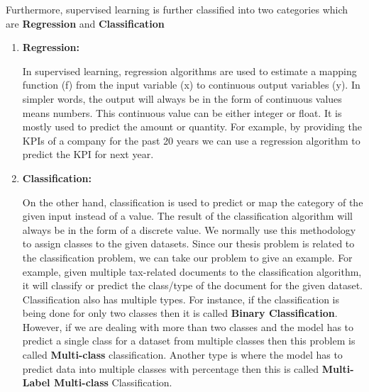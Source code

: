 \newline
\newline
Furthermore, supervised learning is further classified into two categories which are \textbf{Regression} and \textbf{Classification}
\begin{enumerate}[label=(\alph*)]
    \item \textbf{Regression:}
    \par
    In supervised learning, regression algorithms are used to estimate a mapping function (f) from the input variable (x) to continuous output variables (y). In simpler words, the output will always be in the form of continuous values means numbers. This continuous value can be either integer or float. It is mostly used to predict the amount or quantity. For example, by providing the KPIs of a company for the past 20 years we can use a regression algorithm to predict the KPI for next year.
    \item \textbf{Classification:}
    \par
    On the other hand, classification is used to predict or map the category of the given input instead of a value. The result of the classification algorithm will always be in the form of a discrete value. We normally use this methodology to assign classes to the given datasets. Since our thesis problem is related to the classification problem, we can take our problem to give an example. For example, given multiple tax-related documents to the classification algorithm, it will classify or predict the class/type of the document for the given dataset. Classification also has multiple types. For instance, if the classification is being done for only two classes then it is called \textbf{Binary Classification}. However, if we are dealing with more than two classes and the model has to predict a single class for a dataset from multiple classes then this problem is called \textbf{Multi-class} classification. Another type is where the model has to predict data into multiple classes with percentage then this is called \textbf{Multi-Label Multi-class} Classification.
\end{enumerate}
